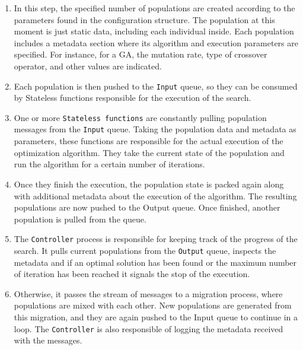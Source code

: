 \documentclass[review]{elsarticle}
\begin{document}
\begin{enumerate}
\item In this step, the specified number of populations are created according to the 
parameters found in the configuration structure. The population at this moment is just
static data, including each individual inside. Each population includes a metadata
section where its algorithm and execution parameters are specified. For instance, 
for a GA, the mutation rate, type of crossover operator, and other values are indicated.

\item Each population is then pushed to the \texttt{Input} queue, so they can be consumed 
by Stateless functions responsible for the execution of the search.  %

\item One or more \texttt{Stateless functions} are constantly pulling population messages
from the \texttt{Input} queue. Taking the population data and metadata as parameters, these 
functions are responsible for the actual execution of the optimization algorithm. 
They take the current state of the population and run the algorithm for a certain 
number of iterations. 

\item Once they finish the execution, the population state
is packed again along with additional metadata about the execution of the algorithm.
The resulting populations are now pushed to the Output queue. Once finished, another 
population is pulled from the queue.

\item The \texttt{Controller} process is responsible for keeping track of the progress of 
the search. It pulls current populations from the \texttt{Output} queue, inspects the metadata 
and if an optimal solution has been found or the maximum number of iteration has been
reached it signals the stop of the execution. 

\item Otherwise, it passes the stream of messages 
to a migration process, where populations are mixed with each other. New populations 
are generated from this migration, and they are again pushed to the Input queue to continue 
in a loop. The \texttt{Controller} is also responsible of logging the metadata received with the
messages.  
\end{enumerate}
\end{document}
